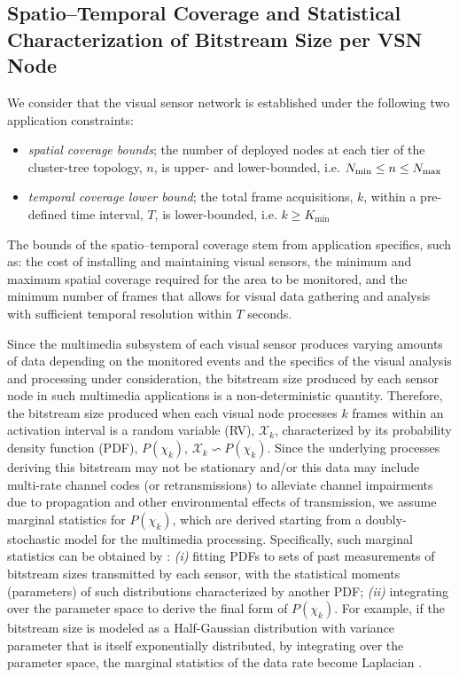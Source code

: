\documentclass[twocolumn,english]{IEEEtran}
\theoremstyle{plain}
\theoremstyle{definition}
\begin{document}
\subsection{Spatio--Temporal Coverage and Statistical Characterization of Bitstream
Size per VSN Node}

We consider that the visual sensor network is established under the
following two application constraints:

\begin{itemize}[leftmargin=*] 
\item

\emph{spatial coverage bounds}; the number of deployed nodes at each
tier of the cluster-tree topology, $n$, is upper- and lower-bounded,
i.e. $N_{\textnormal{min}}\leq n\leq N_{\textnormal{max}}$

\item

\emph{temporal coverage lower bound}; the total frame acquisitions,
$k$, within a pre-defined time interval, $T$, is lower-bounded,
i.e. $k\geq K_{\text{min}}$

\end{itemize}

The bounds of the spatio--temporal coverage stem from application
specifics, such as: the cost of installing and maintaining visual
sensors, the minimum and maximum spatial coverage required for the
area to be monitored, and the minimum number of frames that allows
for visual data gathering and analysis with sufficient temporal resolution
within $T$ seconds.

Since the multimedia subsystem of each visual sensor produces varying
amounts of data depending on the monitored events and the specifics
of the visual analysis and processing under consideration, the bitstream
size produced by each sensor node in such multimedia applications
is a non-deterministic quantity. Therefore, the bitstream size produced
when each visual node processes $k$ frames within an activation interval
is a random variable (RV), $\mathcal{X}_{k}$, characterized by its
probability density function (PDF), $P(\chi_{k})$, $\mathcal{X}_{k}\backsim P(\chi_{k})$.
Since the underlying processes deriving this bitstream may not be
stationary and/or this data may include multi-rate channel codes (or
retransmissions) to alleviate channel impairments due to propagation
and other environmental effects of transmission, we assume marginal
statistics for $P\left(\chi_{k}\right)$, which are derived starting
from a doubly-stochastic model for the multimedia processing. Specifically,
such marginal statistics can be obtained by \cite{LamGoodmanDCT,foo2008analytical}:
\emph{(i)} fitting PDFs to sets of past measurements of bitstream
sizes transmitted by each sensor, with the statistical moments (parameters)
of such distributions characterized by another PDF; \emph{(ii)} integrating
over the parameter space to derive the final form of $P\left(\chi_{k}\right)$.
For example, if the bitstream size is modeled as a Half-Gaussian distribution
with variance parameter that is itself exponentially distributed,
by integrating over the parameter space, the marginal statistics of
the data rate become Laplacian \cite{LamGoodmanDCT,foo2008analytical}.
\end{document}
